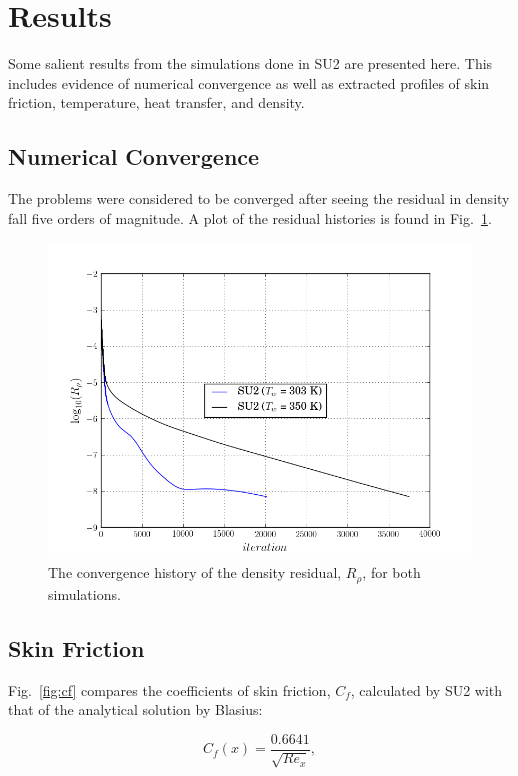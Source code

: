 \documentclass[12pt,letterpaper]{article}
\begin{document}
\section*{Results}
Some salient results from the simulations done in SU2 are presented here. This includes evidence of numerical convergence as well as extracted profiles of skin friction, temperature, heat transfer, and density.

\subsection*{Numerical Convergence}
The problems were considered to be converged after seeing the residual in density fall five orders of magnitude. A plot of the residual histories is found in Fig.~\ref{fig:rho_res}.

\begin{figure}[h] 
\centering
\includegraphics[width=\linewidth]{residuals.png}
\caption{The convergence history of the density residual, $R_\rho$, for both simulations.}
\label{fig:rho_res}
\end{figure}

\subsection*{Skin Friction}
Fig.~\ref{fig:cf} compares the coefficients of skin friction, $C_f$, calculated by SU2 with that of the analytical solution by Blasius:

\begin{equation*}
C_f(x) = \dfrac{0.6641}{\sqrt{Re_x}},
\end{equation*}
\end{document}
